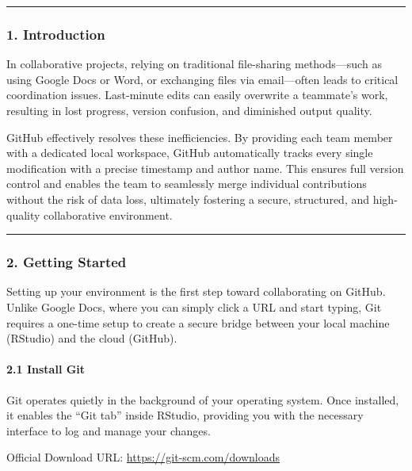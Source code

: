\documentclass[
]{article}
\begin{document}
\begin{center}\rule{0.5\linewidth}{0.5pt}\end{center}

\subsubsection{1. Introduction}\label{introduction}

In collaborative projects, relying on traditional file-sharing
methods---such as using Google Docs or Word, or exchanging files via
email---often leads to critical coordination issues. Last-minute edits
can easily overwrite a teammate's work, resulting in lost progress,
version confusion, and diminished output quality.

GitHub effectively resolves these inefficiencies. By providing each team
member with a dedicated local workspace, GitHub automatically tracks
every single modification with a precise timestamp and author name. This
ensures full version control and enables the team to seamlessly merge
individual contributions without the risk of data loss, ultimately
fostering a secure, structured, and high-quality collaborative
environment.

\begin{center}\rule{0.5\linewidth}{0.5pt}\end{center}

\subsubsection{2. Getting Started}\label{getting-started}

Setting up your environment is the first step toward collaborating on
GitHub. Unlike Google Docs, where you can simply click a URL and start
typing, Git requires a one-time setup to create a secure bridge between
your local machine (RStudio) and the cloud (GitHub).

\paragraph{\texorpdfstring{2.1 Install
Git}{2.1 Install Git }}\label{install-git}

Git operates quietly in the background of your operating system. Once
installed, it enables the ``Git tab'' inside RStudio, providing you with
the necessary interface to log and manage your changes.

Official Download URL: \url{https://git-scm.com/downloads}
\end{document}
